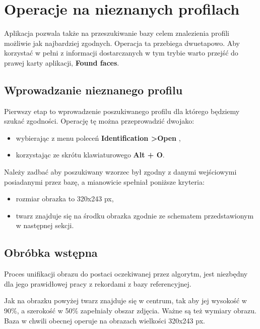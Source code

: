 \documentclass[]{article}
\begin{document}
\section[Odpytywanie bazy]{Operacje na nieznanych profilach}
\label{sec:query}
Aplikacja pozwala także na przeszukiwanie bazy celem znalezienia profili możliwie jak najbardziej zgodnych. Operacja ta przebiega dwuetapowo. Aby korzystać w pełni z informacji dostarczanych w tym trybie warto przejść do prawej karty aplikacji, \textbf{Found faces}.

\subsection{Wprowadzanie nieznanego profilu}
Pierwszy etap to wprowadzenie poszukiwanego profilu dla którego będziemy szukać zgodności. Operację tę można przeprowadzić dwojako:
\begin{itemize}
	\item wybierając z menu poleceń \textbf{Identification \textgreater \space Open	},
	\item korzystając ze skrótu klawiaturowego \textbf{Alt + O}.
\end{itemize}

Należy zadbać aby poszukiwany wzorzec był zgodny z danymi wejściowymi posiadanymi przez bazę, a mianowicie spełniał poniższe kryteria:
\begin{itemize}
	\item rozmiar obrazka to 320x243 px,
	\item twarz znajduje się na środku obrazka zgodnie ze schematem przedstawionym w następnej sekcji.
\end{itemize}

\subsection{Obróbka wstępna}
Proces unifikacji obrazu do postaci oczekiwanej przez algorytm, jest niezbędny dla jego prawidłowej pracy z rekordami z bazy referencyjnej.
\begin{center}
\end{center}
Jak na obrazku powyżej twarz znajduje się w centrum, tak aby jej wysokość w 90\%, a szerokość w 50\% zapełniały obszar zdjęcia. Ważne są też wymiary obrazu. Baza w chwili obecnej operuje na obrazach wielkości 320x243 px.
\end{document}
